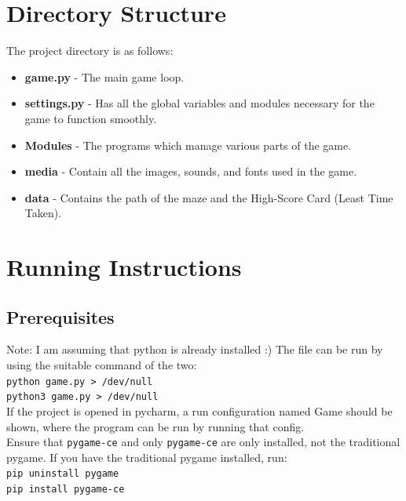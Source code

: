 \documentclass[10pt]{article}
\begin{document}
    \section{Directory Structure}\label{sec:directory-structure}
    The project directory is as follows:




    \begin{itemize}
        \item \textbf{game.py} - The main game loop.
        \item \textbf{settings.py} - Has all the global variables and modules necessary for the game to function smoothly.
        \item \textbf{Modules} - The programs which manage various parts of the game.
        \item \textbf{media} - Contain all the images, sounds, and fonts used in the game.
        \item \textbf{data} - Contains the path of the maze and the High-Score Card (Least Time Taken).
    \end{itemize}


    \section{Running Instructions}\label{sec:running-instructions}

    \subsection{Prerequisites}\label{subsec:prerequisites)}
    Note: I am assuming that python is already installed :)
    The file can be run by using the suitable command of the two: \\
    \texttt{python game.py > /dev/null} \\
    \texttt{python3 game.py > /dev/null} \\
    If the project is opened in pycharm, a run configuration named Game should be shown, where the program can be run by running that config.\\
    Ensure that \texttt{pygame-ce} and only \texttt{pygame-ce} are only installed, not the traditional pygame.
    If you have the traditional pygame installed, run: \\
    \texttt{pip uninstall pygame} \\
    \texttt{pip install pygame-ce}
\end{document}
